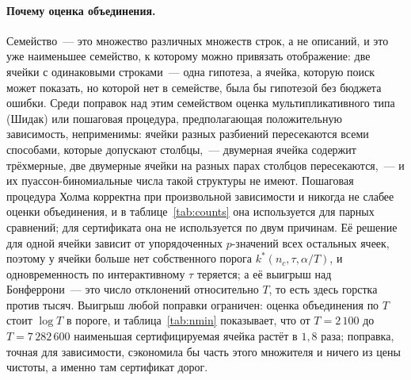\documentclass[11pt]{article}
\begin{document}
\paragraph{Почему оценка объединения.} Семейство~--- это множество различных множеств строк, а не описаний, и это уже наименьшее семейство, к которому можно привязать отображение: две ячейки с одинаковыми строками~--- одна гипотеза, а ячейка, которую поиск может показать, но которой нет в семействе, была бы гипотезой без бюджета ошибки. Среди поправок над этим семейством оценка мультипликативного типа (Шидак) или пошаговая процедура, предполагающая положительную зависимость, неприменимы: ячейки разных разбиений пересекаются всеми способами, которые допускают столбцы,~--- двумерная ячейка содержит трёхмерные, две двумерные ячейки на разных парах столбцов пересекаются,~--- и их пуассон-биномиальные числа такой структуры не имеют. Пошаговая процедура Холма корректна при произвольной зависимости и никогда не слабее оценки объединения, и в таблице~\ref{tab:counts} она используется для парных сравнений; для сертификата она не используется по двум причинам. Её решение для одной ячейки зависит от упорядоченных $p$-значений всех остальных ячеек, поэтому у ячейки больше нет собственного порога $k^*(n_c,\tau,\alpha/T)$, и одновременность по интерактивному $\tau$ теряется; а её выигрыш над Бонферрони~--- это число отклонений относительно $T$, то есть здесь горстка против тысяч. Выигрыш любой поправки ограничен: оценка объединения по $T$ стоит $\log T$ в пороге, и таблица~\ref{tab:nmin} показывает, что от $T=2\,100$ до $T=7\,282\,600$ наименьшая сертифицируемая ячейка растёт в $1{,}8$ раза; поправка, точная для зависимости, сэкономила бы часть этого множителя и ничего из цены чистоты, а именно там сертификат дорог.
\end{document}
